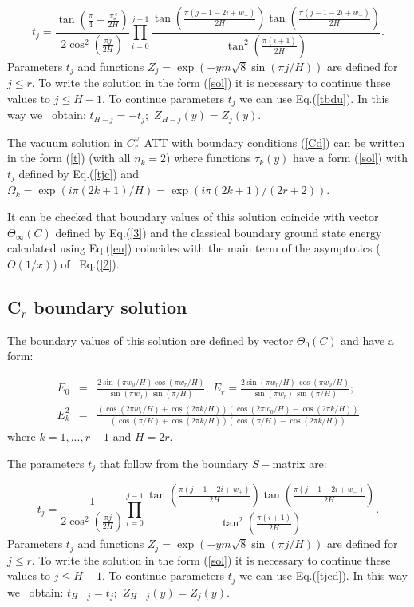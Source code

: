 \documentclass[a4paper,12pt,titlepage,final]{article}
\begin{document}
\begin{equation}
t_{j}=\frac{\tan (\frac{\pi }{4}-\frac{\pi j}{2H})}
{2\cos ^{2}(\frac{\pi j}{2H})}\prod_{i=0}^{j-1}
\frac{\tan (\frac{\pi (j-1-2i+w_{+})}{2H})
\tan (\frac{\pi (j-1-2i+w_{-})}{2H})}
{\tan ^{2}(\frac{\pi (i+1)}{2H})}.  \label{tjc}
\end{equation}
Parameters $t_{j}$ and functions $Z_{j}=\exp (-ym\sqrt{8}\sin (\pi j/H))$
are defined for $j\leq r$. To write the solution in the form (\ref{sol}) it
is necessary to continue these values to $j\leq H-1$. To continue
parameters
$t_{j}$ we can use Eq.(\ref{tbdu}). In this way we \ obtain:
$t_{H-j}=-t_{j}; $ $Z_{H-j}(y)=Z_{j}(y)$.

The vacuum solution in $C_{r}^{\vee }$ ATT with boundary conditions
(\ref{Cd}) can be written in the form (\ref{t})
(with all $n_{k}=2$) where functions
$\tau _{k}(y)$ have a form (\ref{sol}) with $t_{j}$ defined by
Eq.(\ref{tjc}) and
$\Omega _{k}=\exp (i\pi (2k+1)/H)=\exp (i\pi (2k+1)/(2r+2))$.

It can be checked that boundary values of this solution coincide with
vector
$\Theta _{\infty }(C)$ defined by Eq.(\ref{3}) and the classical boundary
ground state energy calculated using Eq.(\ref{en}) coincides with the main
term of the asymptotics ($O(1/x)$) of \ Eq.(\ref{2}).

\subsection{C$_{r}$ boundary solution}

The boundary values of this solution are defined by vector $\Theta _{0}(C)$
and have a form:

\begin{eqnarray}
E_{0} &=&\frac{2\sin (\pi w_{0}/H)\cos (\pi w_{r}/H)}{\sin (\pi w_{0})\,\sin
(\pi /H)};~E_{r}=\frac{2\sin (\pi w_{r}/H)\,\cos (\pi w_{0}/H)}{\sin (\pi
w_{r})\,\sin (\pi /H)};  \nonumber \\
E_{k}^{2} &=&\frac{(\cos (2\pi w_{r}/H)+\cos (2\pi k/H))(\cos (2\pi
w_{0}/H)-\cos (2\pi k/H))}{(\cos (\pi /H)+\cos (2\pi k/H))(\cos (\pi
/H)-\cos (2\pi k/H))}  \label{ec}
\end{eqnarray}
where $k=1,...,r-1$ and $H=2r$.

The parameters $t_{j}$ that follow from the boundary $S-$matrix are:

\begin{equation}
t_{j}=\frac{1}{2\cos ^{2}(\frac{\pi j}{2H})}\prod_{i=0}^{j-1}
\frac{\tan (\frac{\pi (j-1-2i+w_{+})}{2H})
\tan (\frac{\pi (j-1-2i+w_{-})}{2H})}{\tan
^{2}(\frac{\pi (i+1)}{2H})}.  \label{tjcd}
\end{equation}
Parameters $t_{j}$ and functions $Z_{j}=\exp (-ym\sqrt{8}\sin (\pi j/H))$
are defined for $j\leq r$. To write the solution in the form (\ref{sol}) it
is necessary to continue these values to $j\leq H-1$. To continue
parameters
$t_{j}$ we can use Eq.(\ref{tjcd}). In this way we \ obtain:
$t_{H-j}=t_{j};$
$Z_{H-j}(y)=Z_{j}(y)$.
\end{document}
